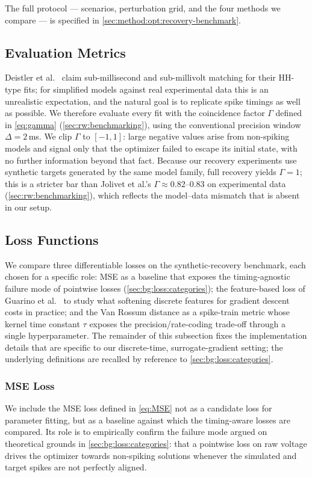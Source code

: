 The full protocol --- scenarios, perturbation grid, and the four methods we compare ---
is specified in \cref{sec:method:opt:recovery-benchmark}.

\subsection{Evaluation Metrics}\label{sec:method:opt:evaluation-metrics}
Deistler et al.~\cite{Deistler2025} claim sub-millisecond and sub-millivolt matching for their \gls{HH}-type fits;
for simplified models against real experimental data this is an unrealistic expectation, and the natural goal is to replicate spike timings as well as possible.
We therefore evaluate every fit with the coincidence factor $\Gamma$ defined in \cref{eq:gamma} (\cref{sec:rw:benchmarking}), using the conventional precision window $\Delta = 2$\,ms.
We clip $\Gamma$ to $[-1, 1]$: large negative values arise from non-spiking models and signal only that the optimizer failed to escape its initial state, with no further information beyond that fact.
Because our recovery experiments use synthetic targets generated by the same model family, full recovery yields $\Gamma = 1$;
this is a stricter bar than Jolivet et al.'s $\Gamma \approx 0.82$--$0.83$ on experimental data (\cref{sec:rw:benchmarking}), which reflects the model--data mismatch that is absent in our setup.

\subsection{Loss Functions}\label{sec:method:opt:loss}
We compare three differentiable losses on the synthetic-recovery benchmark, each chosen for a specific role:
\gls{MSE} as a baseline that exposes the timing-agnostic failure mode of pointwise losses (\cref{sec:bg:loss:categories});
the feature-based loss of Guarino et al.~\cite{Guarino2025} to study what softening discrete features for gradient descent costs in practice;
and the Van Rossum distance as a spike-train metric whose kernel time constant $\tau$ exposes the precision/rate-coding trade-off through a single hyperparameter.
The remainder of this subsection fixes the implementation details that are specific to our discrete-time, surrogate-gradient setting; the underlying definitions are recalled by reference to \cref{sec:bg:loss:categories}.

\subsubsection{MSE Loss}\label{sec:method:opt:loss:mse-loss}
We include the \gls{MSE} loss defined in \cref{eq:MSE} not as a candidate loss for parameter fitting,
but as a baseline against which the timing-aware losses are compared.
Its role is to empirically confirm the failure mode argued on theoretical grounds in \cref{sec:bg:loss:categories}:
that a pointwise loss on raw voltage drives the optimizer towards non-spiking solutions whenever the simulated and target spikes are not perfectly aligned.

